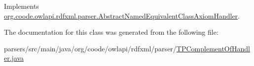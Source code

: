Implements \hyperlink{classorg_1_1coode_1_1owlapi_1_1rdfxml_1_1parser_1_1_abstract_named_equivalent_class_axiom_handler_ae27dd1195983d081500e4c20dfc3552d}{org.\-coode.\-owlapi.\-rdfxml.\-parser.\-Abstract\-Named\-Equivalent\-Class\-Axiom\-Handler}.



The documentation for this class was generated from the following file\-:\begin{DoxyCompactItemize}
\item 
parsers/src/main/java/org/coode/owlapi/rdfxml/parser/\hyperlink{_t_p_complement_of_handler_8java}{T\-P\-Complement\-Of\-Handler.\-java}\end{DoxyCompactItemize}
